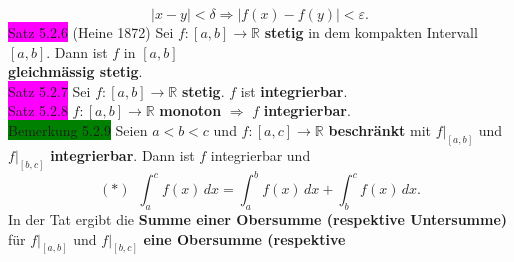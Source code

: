 \documentclass[landscape, 10pt]{article}
\newcommand{\R}{\mathbb{R}}
\begin{document}
\begin{multicols}{3}
                     \begin{equation*}
                            |x-y|<\delta
                            \Longrightarrow|
                            f(x)-f(y)|<\varepsilon. 
                     \end{equation*}
              \colorbox{magenta}{Satz 5.2.6} 
                     (Heine 1872) Sei 
                     \textcolor{NavyBlue}{
                     $f:[a,b]\longrightarrow\R$}
                     \textbf{stetig} in dem kompakten Intervall 
                     \textcolor{NavyBlue}{$[a,b]$}. 
                     Dann ist \textcolor{NavyBlue}{$f$} in 
                     \textcolor{NavyBlue}{$[a,b]$}\\
                     \textbf{gleichmässig stetig}.\\
              \colorbox{magenta}{Satz 5.2.7} 
                     Sei \textcolor{NavyBlue}{
                     $f:[a,b]\longrightarrow\R$} 
                     \textbf{stetig}. 
                     \textcolor{NavyBlue}{$f$} ist
                     \textbf{integrierbar}.\\
              \colorbox{magenta}{Satz 5.2.8} 
                     \textcolor{NavyBlue}{
                     $f:[a,b]\longrightarrow\R$} 
                     \textbf{monoton}
                     $\Rightarrow$
                     \textcolor{NavyBlue}{$f$} 
                     \textbf{integrierbar}.\\
              \colorbox{green}{Bemerkung 5.2.9} 
                     Seien \textcolor{NavyBlue}{$a<b<c$} und 
                     \textcolor{NavyBlue}{$f:[a,c]\longrightarrow\R$} 
                     \textbf{beschränkt} mit 
                     \textcolor{NavyBlue}{$f|_{[a,b]}$} und 
                     \textcolor{NavyBlue}{$f|_{[b,c]}$} 
                     \textbf{integrierbar}. Dann ist 
                     \textcolor{NavyBlue}{$f$} integrierbar und 
                     \begin{equation*}
                            (*)\enspace
                            \int_a^cf(x)\,dx
                            =\int_a^bf(x)\,dx
                            +\int_b^cf(x)\,dx.
                     \end{equation*}
                     In der Tat ergibt die 
                     \textbf{Summe einer Obersumme 
                     (respektive Untersumme)} für 
                     \textcolor{NavyBlue}{$f|_{[a,b]}$} und 
                     \textcolor{NavyBlue}{$f|_{[b,c]}$} 
                     \textbf{eine Obersumme (respektive 
}
\end{multicols}
\end{document}
